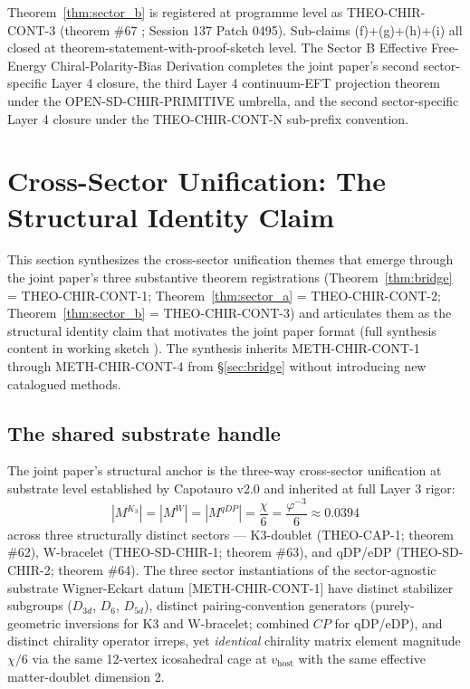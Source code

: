 \documentclass[11pt,letterpaper]{article}
\newcommand{\Dsix}{D_6}
\newcommand{\methref}[1]{\textsf{\small[\textsc{#1}]}}
\begin{document}
Theorem~\ref{thm:sector_b} is registered at programme level as THEO-CHIR-CONT-3 (theorem \#67 \cite{ResearchFrontier}; Session 137 Patch 0495). Sub-claims (f)+(g)+(h)+(i) all closed at theorem-statement-with-proof-sketch level. The Sector B Effective Free-Energy Chiral-Polarity-Bias Derivation completes the joint paper's second sector-specific Layer 4 closure, the third Layer 4 continuum-EFT projection theorem under the OPEN-SD-CHIR-PRIMITIVE umbrella, and the second sector-specific Layer 4 closure under the THEO-CHIR-CONT-N sub-prefix convention.

\section{Cross-Sector Unification: The Structural Identity Claim}
\label{sec:cross_sector_unification}

This section synthesizes the cross-sector unification themes that emerge through the joint paper's three substantive theorem registrations (Theorem~\ref{thm:bridge} = THEO-CHIR-CONT-1; Theorem~\ref{thm:sector_a} = THEO-CHIR-CONT-2; Theorem~\ref{thm:sector_b} = THEO-CHIR-CONT-3) and articulates them as the structural identity claim that motivates the joint paper format (full synthesis content in working sketch \cite{ChiContSketchD}). The synthesis inherits METH-CHIR-CONT-1 through METH-CHIR-CONT-4 from §\ref{sec:bridge} without introducing new catalogued methods.

\subsection{The shared substrate handle}
\label{sec:shared_substrate_handle}

The joint paper's structural anchor is the three-way cross-sector unification at substrate level established by Capotauro v2.0 \cite{Capotauro} and inherited at full Layer 3 rigor:
\begin{equation}
\left| M^{K_3} \right| = \left| M^W \right| = \left| M^{qDP} \right| = \frac{\chi}{6} = \frac{\varphi^{-3}}{6} \approx 0.0394
\label{eq:three_way_unification_repeated}
\end{equation}
across three structurally distinct sectors --- K3-doublet (THEO-CAP-1; theorem \#62), W-bracelet (THEO-SD-CHIR-1; theorem \#63), and qDP/eDP (THEO-SD-CHIR-2; theorem \#64). The three sector instantiations of the sector-agnostic substrate Wigner-Eckart datum \methref{METH-CHIR-CONT-1} have distinct stabilizer subgroups ($D_{3d}$, $\Dsix$, $D_{5d}$), distinct pairing-convention generators (purely-geometric inversions for K3 and W-bracelet; combined $CP$ for qDP/eDP), and distinct chirality operator irreps, yet \emph{identical} chirality matrix element magnitude $\chi/6$ via the same 12-vertex icosahedral cage at $v_{\text{host}}$ with the same effective matter-doublet dimension 2.
\end{document}
